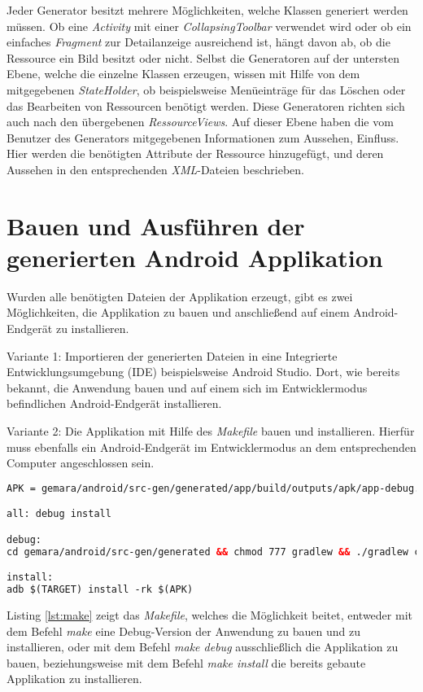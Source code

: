 Jeder Generator besitzt mehrere Möglichkeiten, welche Klassen generiert werden müssen. Ob eine \textit{Activity} mit einer \textit{CollapsingToolbar} verwendet wird oder ob ein einfaches \textit{Fragment} zur Detailanzeige ausreichend ist, hängt davon ab, ob die Ressource ein Bild besitzt oder nicht.
Selbst die Generatoren auf der untersten Ebene, welche die einzelne Klassen erzeugen, wissen mit Hilfe von dem mitgegebenen \textit{StateHolder}, ob beispielsweise Menüeinträge für das Löschen oder das Bearbeiten von Ressourcen benötigt werden. Diese Generatoren richten sich auch nach den übergebenen \textit{RessourceViews}. Auf dieser Ebene haben die vom Benutzer des Generators mitgegebenen Informationen zum Aussehen, Einfluss. Hier werden die benötigten Attribute der Ressource hinzugefügt, und deren Aussehen in den entsprechenden \textit{XML}-Dateien beschrieben.


\section{Bauen und Ausführen der generierten Android Applikation}

Wurden alle benötigten Dateien der Applikation erzeugt, gibt es zwei Möglichkeiten, die Applikation zu bauen und anschließend auf einem Android-Endgerät zu installieren.

Variante 1: Importieren der generierten Dateien in eine Integrierte Entwicklungsumgebung (IDE) beispielsweise Android Studio. Dort, wie bereits bekannt, die Anwendung bauen und auf einem sich im Entwicklermodus befindlichen Android-Endgerät installieren.

Variante 2: Die Applikation mit Hilfe des \textit{Makefile} bauen und installieren. Hierfür muss ebenfalls ein Android-Endgerät im Entwicklermodus an dem entsprechenden Computer angeschlossen sein.

\newpage

\begin{lstlisting}[label=lst:make,
language=xml,
firstnumber=1,
caption=\textit{Makefile} für das Bauen und Installieren der erzeugten Applikation.]				   
APK = gemara/android/src-gen/generated/app/build/outputs/apk/app-debug.apk

all: debug install

debug:
cd gemara/android/src-gen/generated && chmod 777 gradlew && ./gradlew clean assembleDebug

install:
adb $(TARGET) install -rk $(APK)
\end{lstlisting}

Listing \ref{lst:make} zeigt das \textit{Makefile}, welches die Möglichkeit beitet, entweder mit dem Befehl \textit{make} eine Debug-Version der Anwendung zu bauen und zu installieren, oder mit dem Befehl \textit{make debug} ausschließlich die Applikation zu bauen, beziehungsweise mit dem Befehl \textit{make install} die bereits gebaute Applikation zu installieren.
